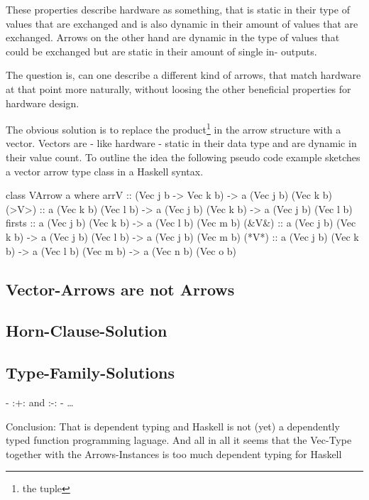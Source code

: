 \documentclass[9pt,final,a4paper,leqno]{article}
\begin{document}
\par
These properties describe hardware as something, that is static in their type of values that are exchanged and is also dynamic in their
amount of values that are exchanged. Arrows on the other hand are dynamic in the type of values that could be exchanged but are static in
their amount of single in- outputs. 

\par
The question is, can one describe a different kind of arrows, that match hardware at that point more naturally, without loosing the other
beneficial properties for hardware design. 

\par
The obvious solution is to replace the product\footnote{the tuple} in the arrow structure with a vector. Vectors are - like hardware -
static in their data type and are dynamic in their value count. To outline the idea the following pseudo code example sketches a vector
arrow type class in a Haskell syntax.
\begin{haskell}
class VArrow a where
  arrV   :: (Vec j b ->  Vec k b) -> a (Vec j b) (Vec k b)
  (>V>)  :: a (Vec k b) (Vec l b) -> a (Vec j b) (Vec k b) -> a (Vec j b) (Vec l b)
  firsts :: a (Vec j b) (Vec k b) -> a (Vec l b) (Vec m b)
  (&V&)  :: a (Vec j b) (Vec k b) -> a (Vec j b) (Vec l b) -> a (Vec j b) (Vec m b)
  (*V*)  :: a (Vec j b) (Vec k b) -> a (Vec l b) (Vec m b) -> a (Vec n b) (Vec o b)
\end{haskell}


\subsection{Vector-Arrows are not Arrows}

\subsection{Horn-Clause-Solution}

\subsection{Type-Family-Solutions}

-  :+: and :-:
- \ldots

Conclusion: That is dependent typing and Haskell is not (yet) a dependently typed function programming laguage. And all
in all it seems that the Vec-Type together with the Arrows-Instances is too much dependent typing for Haskell
\end{document}
